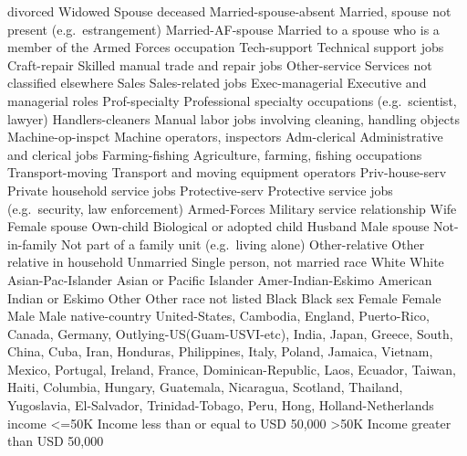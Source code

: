 \documentclass[
  letterpaper,
  DIV=11,
  numbers=noendperiod]{scrartcl}
\begin{document}
divorced \textbar{} \textbar{} \textbar{} Widowed \textbar{} Spouse
deceased \textbar{} \textbar{} \textbar{}
Married-spouse-absent\textbar{} Married, spouse not present
(e.g.~estrangement) \textbar{} \textbar{} \textbar{} Married-AF-spouse
\textbar{} Married to a spouse who is a member of the Armed Forces
\textbar{} \textbar{} occupation \textbar{} Tech-support \textbar{}
Technical support jobs \textbar{} \textbar{} \textbar{} Craft-repair
\textbar{} Skilled manual trade and repair jobs \textbar{} \textbar{}
\textbar{} Other-service \textbar{} Services not classified elsewhere
\textbar{} \textbar{} \textbar{} Sales \textbar{} Sales-related jobs
\textbar{} \textbar{} \textbar{} Exec-managerial \textbar{} Executive
and managerial roles \textbar{} \textbar{} \textbar{} Prof-specialty
\textbar{} Professional specialty occupations (e.g.~scientist, lawyer)
\textbar{} \textbar{} \textbar{} Handlers-cleaners \textbar{} Manual
labor jobs involving cleaning, handling objects \textbar{} \textbar{}
\textbar{} Machine-op-inspct \textbar{} Machine operators, inspectors
\textbar{} \textbar{} \textbar{} Adm-clerical \textbar{} Administrative
and clerical jobs \textbar{} \textbar{} \textbar{} Farming-fishing
\textbar{} Agriculture, farming, fishing occupations \textbar{}
\textbar{} \textbar{} Transport-moving \textbar{} Transport and moving
equipment operators \textbar{} \textbar{} \textbar{} Priv-house-serv
\textbar{} Private household service jobs \textbar{} \textbar{}
\textbar{} Protective-serv \textbar{} Protective service jobs
(e.g.~security, law enforcement) \textbar{} \textbar{} \textbar{}
Armed-Forces \textbar{} Military service \textbar{} \textbar{}
relationship \textbar{} Wife \textbar{} Female spouse \textbar{}
\textbar{} \textbar{} Own-child \textbar{} Biological or adopted child
\textbar{} \textbar{} \textbar{} Husband \textbar{} Male spouse
\textbar{} \textbar{} \textbar{} Not-in-family \textbar{} Not part of a
family unit (e.g.~living alone) \textbar{} \textbar{} \textbar{}
Other-relative \textbar{} Other relative in household \textbar{}
\textbar{} \textbar{} Unmarried \textbar{} Single person, not married
\textbar{} \textbar{} race \textbar{} White \textbar{} White \textbar{}
\textbar{} \textbar{} Asian-Pac-Islander \textbar{} Asian or Pacific
Islander \textbar{} \textbar{} \textbar{} Amer-Indian-Eskimo \textbar{}
American Indian or Eskimo \textbar{} \textbar{} \textbar{} Other
\textbar{} Other race not listed \textbar{} \textbar{} \textbar{} Black
\textbar{} Black \textbar{} \textbar{} sex \textbar{} Female \textbar{}
Female \textbar{} \textbar{} \textbar{} Male \textbar{} Male \textbar{}
\textbar{} native-country \textbar{} United-States, Cambodia, England,
Puerto-Rico, Canada, Germany, Outlying-US(Guam-USVI-etc), India, Japan,
Greece, South, China, Cuba, Iran, Honduras, Philippines, Italy, Poland,
Jamaica, Vietnam, Mexico, Portugal, Ireland, France, Dominican-Republic,
Laos, Ecuador, Taiwan, Haiti, Columbia, Hungary, Guatemala, Nicaragua,
Scotland, Thailand, Yugoslavia, El-Salvador, Trinidad-Tobago, Peru,
Hong, Holland-Netherlands \textbar{} \textbar{} \textbar{} income
\textbar{} \textless=50K \textbar{} Income less than or equal to USD
50,000 \textbar{} \textbar{} \textbar{} \textgreater50K \textbar{}
Income greater than USD 50,000 \textbar{}
\end{document}
